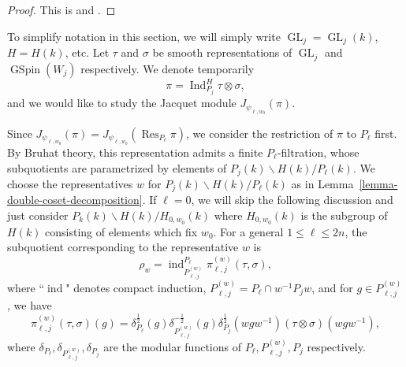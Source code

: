 \documentclass[12pt]{amsart}
\newcommand{\Res}{\operatorname{Res}}
\newcommand{\ind}{\operatorname{ind}}
\theoremstyle{remark}
\DeclareMathOperator{\Ind}{Ind}
\DeclareMathOperator{\GL}{GL}
\DeclareMathOperator{\GSpin}{GSpin}
\begin{document}
\begin{proof}
This is \cite[Lemma 3.5]{Yan2025GGP} and \cite[Lemma 3.6]{Yan2025GGP}.
\end{proof}






To simplify notation in this section, we will simply write $\GL_j=\GL_j(k)$, $H=H(k)$, etc. 
Let $\tau$ and $\sigma$ be smooth representations of $\GL_j$ and $\GSpin(W_j)$ respectively. 
We denote temporarily 
\begin{equation*}
\pi=	\Ind_{P_j}^H \tau\otimes \sigma,
\end{equation*}
and we  would like to study the Jacquet module $J_{\psi_{\ell, w_0}}(\pi)$.

Since $J_{\psi_{\ell, w_0}}(\pi)=J_{\psi_{\ell, w_0}}(\Res_{P_\ell}\pi)$, we consider the restriction of $\pi$ to $P_\ell$ first. 
By Bruhat theory, this representation admits a finite $P_{\ell}$-filtration, whose subquotients are parametrized by elements of $P_j(k) \backslash H(k)/P_{\ell}(k)$. We choose the representatives $w$ for $P_j(k) \backslash H(k)/P_{\ell}(k)$ as in Lemma~\ref{lemma-double-coset-decomposition}. 
If $\ell=0$, we will skip the following discussion and just consider $P_k(k)\backslash H(k) / H_{0,w_0}(k)$ where $H_{0,w_0}(k)$ is the subgroup of $H(k)$ consisting of elements which fix $w_0$.  For a general $1\le \ell\le 2n$, the subquotient corresponding to the representative $w$ is
\begin{equation*}
\rho_{w}=	\ind_{P_{\ell, j}^{(w)}}^{P_\ell} \pi_{\ell, j}^{(w)}(\tau, \sigma),
\end{equation*}
where 
``$\ind$" denotes compact induction, $P_{\ell, j}^{(w)}=P_{\ell}\cap  w^{-1}P_jw$, and for $g\in P_{\ell, j}^{(w)}$, we have
\begin{equation*}
	\pi_{\ell, j}^{(w)}(\tau, \sigma)(g)=\delta_{P_{\ell}}^{\frac{1}{2}}(g)\delta_{P_{\ell, j}^{(w)}}^{-\frac{1}{2}}(g)\delta_{P_j}^{\frac{1}{2}}(wgw^{-1}) (\tau\otimes\sigma)(wgw^{-1}),
\end{equation*}
where $\delta_{P_{\ell}}, \delta_{P_{\ell, j}^{(w)}}, \delta_{P_j}$ are the modular functions of $P_{\ell}, P_{\ell, j}^{(w)}, P_j$ respectively.  
\end{document}
